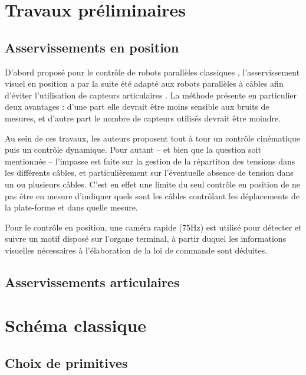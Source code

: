 \section{Travaux pr\'eliminaires}

\subsection{Asservissements en position}

D'abord propos\'e pour le contr\^ole de robots parall\`eles classiques 
\cite{dallej.2006}, l'asservissement visuel en position a par la suite \'et\'e 
adapt\'e aux robots parall\`eles \`a c\^ables afin d'\'eviter l'utilisation de 
capteurs articulaires \cite{dallej2012} \cite{dallej2011}. La m\'ethode 
pr\'esente en particulier deux avantages : d'une part elle devrait \^etre moins 
sensible aux bruits de mesures, et d'autre part le nombre de capteurs utilis\'es 
devrait \^etre moindre.

Au sein de ces travaux, les auteurs proposent tout \`a tour un contr\^ole 
cin\'ematique puis un contr\^ole dynamique. Pour autant -- et bien que la 
question soit mentionn\'ee -- l'impasse est faite sur la gestion de la 
r\'epartiton des tensions dans les diff\'erents c\^ables, et particuli\`erement 
sur l'\'eventuelle absence de tension dans un ou plusieurs c\^ables. C'est en 
effet une limite du seul contr\^ole en position de ne pas \^etre en mesure 
d'indiquer quels sont les c\^ables contr\^olant les d\'eplacements de la 
plate-forme et dans quelle mesure.

Pour le contr\^ole en position, une cam\'era rapide (75Hz) est utilis\'e pour 
d\'etecter et suivre un motif dispos\'e sur l'organe terminal, \`a partir duquel 
les informations visuelles n\'ecessaires \`a l'\'elaboration de la loi de 
commande sont d\'eduites. 


\subsection{Asservissements articulaires}


\section{Sch\'ema classique}

\subsection{Choix de primitives}

